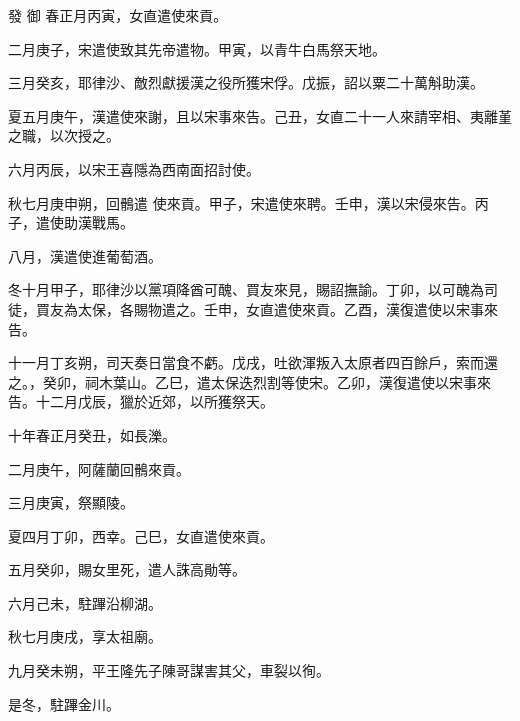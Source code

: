 
\begin{pinyinscope}

 發
 御
 春正月丙寅，女直遣使來貢。



 二月庚子，宋遣使致其先帝遣物。甲寅，以青牛白馬祭天地。



 三月癸亥，耶律沙、敵烈獻援漢之役所獲宋俘。戊振，詔以粟二十萬斛助漢。



 夏五月庚午，漢遣使來謝，且以宋事來告。己丑，女直二十一人來請宰相、夷離堇之職，以次授之。



 六月丙辰，以宋王喜隱為西南面招討使。



 秋七月庚申朔，回鶻遣
 使來貢。甲子，宋遣使來聘。壬申，漢以宋侵來告。丙子，遣使助漢戰馬。



 八月，漢遣使進葡萄酒。



 冬十月甲子，耶律沙以黨項降酋可醜、買友來見，賜詔撫諭。丁卯，以可醜為司徒，買友為太保，各賜物遣之。壬申，女直遣使來貢。乙酉，漢復遣使以宋事來告。



 十一月丁亥朔，司天奏日當食不虧。戊戌，吐欲渾叛入太原者四百餘戶，索而還之。，癸卯，祠木葉山。乙巳，遣太保迭烈割等使宋。乙卯，漢復遣使以宋事來告。十二月戊辰，獵於近郊，以所獲祭天。



 十年春正月癸丑，如長濼。



 二月庚午，阿薩蘭回鶻來貢。



 三月庚寅，祭顯陵。



 夏四月丁卯，西幸。己巳，女直遣使來貢。



 五月癸卯，賜女里死，遣人誅高勛等。



 六月己未，駐蹕沿柳湖。



 秋七月庚戌，享太祖廟。



 九月癸未朔，平王隆先子陳哥謀害其父，車裂以徇。



 是冬，駐蹕金川。




\end{pinyinscope}
